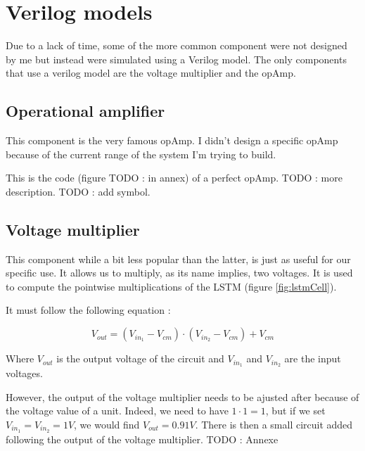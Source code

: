 \section{Verilog models}
\label{sec:models}

Due to a lack of time, some of the more common component were not designed by me but instead were simulated using a Verilog model. The only components that use a verilog model are the voltage multiplier and the \ac{opAmp}.

\subsection{Operational amplifier}

This component is the very famous \ac{opAmp}. I didn't design a specific \ac{opAmp} because of the current range of the system I'm trying to build.

This is the code (figure TODO : in annex) of a perfect \ac{opAmp}. TODO : more description.
TODO : add symbol.

\subsection{Voltage multiplier}

This component while a bit less popular than the latter, is just as useful for our specific use. It allows us to multiply, as its name implies, two voltages. It is used to compute the pointwise multiplications of the \ac{LSTM} (figure \ref{fig:lstmCell}).

It must follow the following equation :

\begin{equation}
V_{out}=(V_{in_1}-V_{cm})\cdot (V_{in_2}-V_{cm}) + V_{cm}
\end{equation}

Where $V_{out}$ is the output voltage of the circuit and $V_{in_1}$ and $V_{in_2}$ are the input voltages.

However, the output of the voltage multiplier needs to be ajusted after because of the voltage value of a unit. Indeed, we need to have $1\cdot 1=1$, but if we set $V_{in_1}=V_{in_2}=1V$, we would find $V_{out}=0.91V$. There is then a small circuit added following the output of the voltage multiplier. TODO : Annexe
